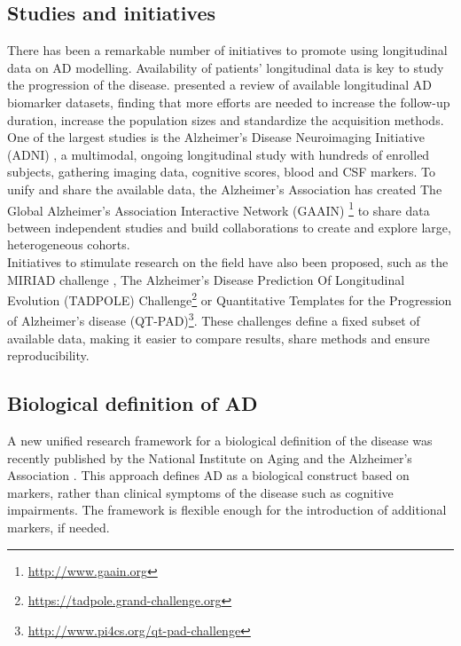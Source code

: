 \subsection{Studies and initiatives} 
\label{biomarkers:studies}

There has been a remarkable number of initiatives to promote using longitudinal data on AD modelling. Availability of patients' longitudinal data is key to study the progression of the disease. \cite{Lawrence2017} presented a review of available longitudinal AD biomarker datasets, finding that more efforts are needed to increase the follow-up duration, increase the population sizes and standardize the acquisition methods. One of the largest studies is the Alzheimer's Disease Neuroimaging Initiative (ADNI) \cite{Mueller2005}, a multimodal, ongoing longitudinal study with hundreds of enrolled subjects, gathering imaging data, cognitive scores, blood and CSF markers. To unify and share the available data, the Alzheimer's Association has created The Global Alzheimer’s Association Interactive Network (GAAIN) \footnote{\url{http://www.gaain.org}} to share data between independent studies and build collaborations to create and explore large, heterogeneous cohorts. \\

Initiatives to stimulate research on the field have also been proposed, such as the MIRIAD challenge \cite{miriad}, The Alzheimer's Disease Prediction Of Longitudinal Evolution (TADPOLE) Challenge\footnote{\url{https://tadpole.grand-challenge.org}} or Quantitative Templates for the Progression of Alzheimer’s disease (QT-PAD)\footnote{\url{http://www.pi4cs.org/qt-pad-challenge}}. These challenges define a fixed subset of available data, making it easier to compare results, share methods and ensure reproducibility. \\


\subsection{Biological definition of AD}
A new unified research framework for a biological definition of the disease was recently published by the National Institute on Aging and the Alzheimer's Association \cite{Jack2018}. This approach defines AD as a biological construct based on markers, rather than clinical symptoms of the disease such as cognitive impairments. The framework is flexible enough for the introduction of additional markers, if needed. \\

